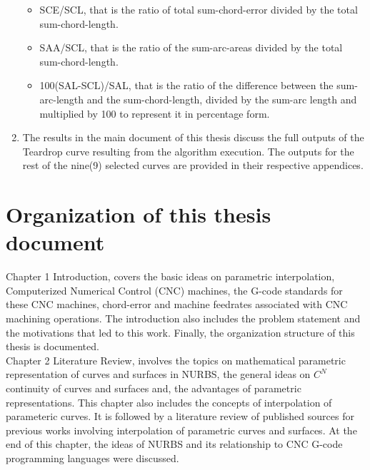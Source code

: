 \begin{enumerate}
\begin{itemize}
		\item SCE/SCL, that is the ratio of total sum-chord-error divided by the total sum-chord-length.
		
		\item SAA/SCL, that is the ratio of the sum-arc-areas divided by the total sum-chord-length.
		
		\item 100(SAL-SCL)/SAL, that is the ratio of the difference between the sum-arc-length and the sum-chord-length, divided by the sum-arc length and multiplied by 100 to represent it in percentage form.
		
	\end{itemize}
	
	\item The results in the main document of this thesis discuss the full outputs of the Teardrop curve resulting from the algorithm execution. The outputs for the rest of the nine(9) selected curves are provided in their respective appendices.	
	
\end{enumerate}




\clearpage
\pagebreak

\section{Organization of this thesis document}

Chapter 1 Introduction, covers the basic ideas on parametric interpolation, Computerized Numerical Control (CNC) machines, the G-code standards for these CNC machines, chord-error and machine feedrates associated with CNC machining operations. The introduction also includes the problem statement and the motivations that led to this work. Finally, the organization structure of this thesis is documented.\\ 

Chapter 2 Literature Review, involves the topics on mathematical parametric representation of curves and surfaces in NURBS, the general ideas on $C^{N}$ continuity of curves and surfaces and, the advantages of parametric representations. This chapter also includes the concepts of interpolation of parameteric curves. It is followed by a literature review of published sources for previous works involving interpolation of parametric curves and surfaces. At the end of this chapter, the ideas of NURBS and its relationship to CNC G-code programming languages were discussed.\\

